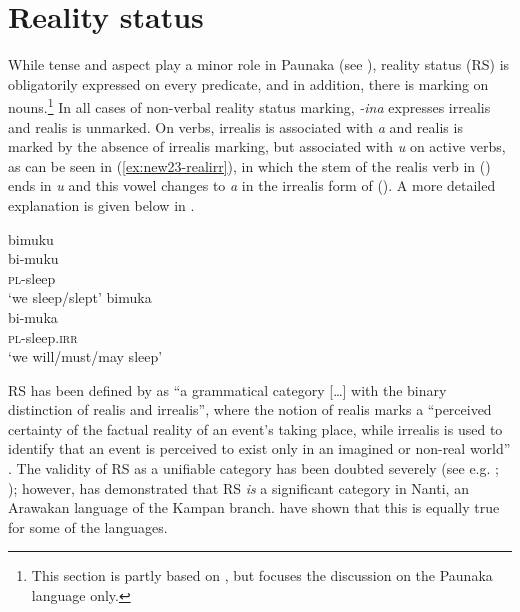 \section{Reality status}\label{sec:RealityStatus}

While tense and aspect play a minor role in Paunaka (see ), reality status (RS) is obligatorily expressed on every predicate, and in addition, there is  marking on nouns.\footnote{This section is partly based on \citet[]{DanielsenTerhartSubm}, but focuses the discussion on the Paunaka language only.} In all cases of non-verbal reality status marking, \textit{-ina} expresses irrealis and realis is unmarked. On verbs, irrealis is associated with \textit{a} and realis is marked by the absence of irrealis marking, but associated with \textit{u} on active verbs, as can be seen in (\ref{ex:new23-realirr}), in which the stem of the realis verb in () ends in \textit{u} and this vowel changes to \textit{a} in the irrealis form of (). A more detailed explanation is given below in .

\ea\label{ex:new23-realirr}
  \ea\label{ex:new23-realirr.1}
\begingl
\glpreamble bimuku\\
\gla bi-muku\\
\textsc{pl}-sleep\\
\glft ‘we sleep/slept’
\endgl
  \ex\label{ex:new23-realirr.2}
\begingl
\glpreamble bimuka\\
\gla bi-muka\\
\textsc{pl}-sleep.\textsc{irr}\\
\glft ‘we will/must/may sleep’
\endgl
\z
\xe

RS has been defined by \citet[56]{Elliott2000} as “a grammatical category […] with the binary distinction of realis and irrealis”, where the notion of realis marks a “perceived certainty of the factual reality of an event's taking place, while irrealis is used to identify that an event is perceived to exist only in an imagined or non-real world” \citep[67]{Elliott2000}. 
The validity of RS as a unifiable category has been doubted severely (see e.g. \citealt{Bybee1998}; \citealt{deHaan2012}); however, \citet[]{Michael2014,Michael2014a} has demonstrated that RS \textit{is} a significant category in Nanti, an Arawakan language of the Kampan branch. \citet[]{DanielsenTerhartSubm} have shown that this is equally true for some of the  languages.

